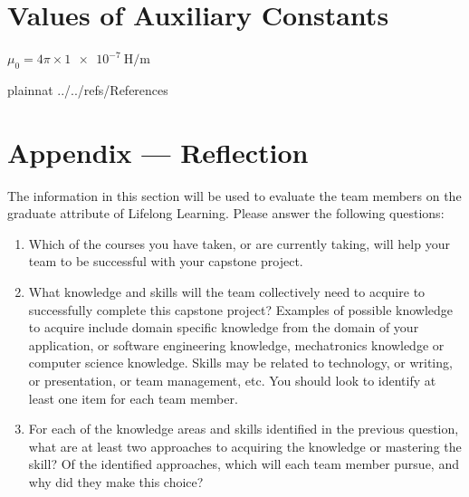 \documentclass[12pt]{article}
\begin{document}



\section{Values of Auxiliary Constants}
{
$\mu_0 = 4\pi \times \SI{1e-7}{\henry\per\meter}$
}

\newpage

 {plainnat}
 {../../refs/References}

\newpage

\newpage{}
\section*{Appendix --- Reflection}

The information in this section will be used to evaluate the team members on the
graduate attribute of Lifelong Learning.  Please answer the following questions:

\begin{enumerate}
  \item Which of the courses you have taken, or are currently taking, will help
  your team to be successful with your capstone project.
  \item What knowledge and skills will the team collectively need to acquire to
  successfully complete this capstone project?  Examples of possible knowledge
  to acquire include domain specific knowledge from the domain of your
  application, or software engineering knowledge, mechatronics knowledge or
  computer science knowledge.  Skills may be related to technology, or writing,
  or presentation, or team management, etc.  You should look to identify at
  least one item for each team member.
  \item For each of the knowledge areas and skills identified in the previous
  question, what are at least two approaches to acquiring the knowledge or
  mastering the skill?  Of the identified approaches, which will each team
  member pursue, and why did they make this choice?
\end{enumerate}
\end{document}
